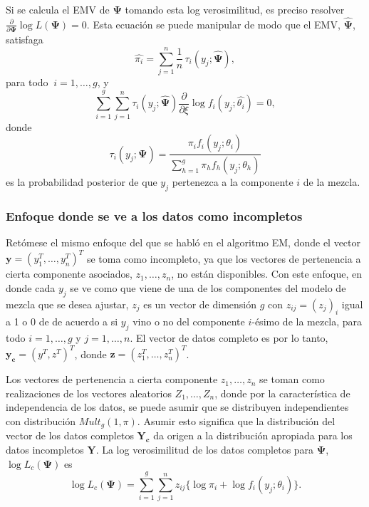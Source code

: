 \documentclass[
]{article}
\begin{document}
Si se calcula el EMV de \(\bm{\Psi}\) tomando esta log verosimilitud, es
preciso resolver
\(\frac{\partial}{\partial \bm{\Psi}} \log L(\bm{\Psi})=0\). Esta
ecuación se puede manipular de modo que el EMV, \(\bm{\hat{\Psi}}\),
satisfaga \begin{equation}
\hat{\pi_i}=\sum_{j=1}^n \frac{1}{n} \,\tau_i(y_j;\bm{\hat{\Psi}})\label{pis},
\end{equation} para todo \(\ i=1,\ldots,g\), y \begin{equation}
\sum_{i=1}^g \sum_{j=1}^n \tau_i(y_j;\bm{\hat{\Psi}}) \frac{\partial}{\partial \xi} \log f_i(y_j;\hat{\theta_i})=0,
\end{equation} donde \begin{equation}
\tau_i (y_j;\bm{\Psi})= \frac{ \pi_i f_i(y_j;\theta_i)}{\sum_{h=1}^{g} \pi_h f_h(y_j;\theta_h)}\label{tau}
\end{equation} es la probabilidad posterior de que \(y_j\) pertenezca a
la componente \(i\) de la mezcla.

\subsubsection{Enfoque donde se ve a los datos como incompletos}

Retómese el mismo enfoque del que se habló en el algoritmo EM, donde el
vector \(\bm{y}=(y_1^T,\ldots,y_n^T)^T\) se toma como incompleto, ya que
los vectores de pertenencia a cierta componente asociados,
\(z_1,\ldots,z_n\), no están disponibles. Con este enfoque, en donde
cada \(y_j\) se ve como que viene de una de los componentes del modelo
de mezcla que se desea ajustar, \(z_j\) es un vector de dimensión \(g\)
con \(z_{ij}=(z_j)_i\) igual a 1 o 0 de de acuerdo a si \(y_j\) vino o
no del componente \(i\)-ésimo de la mezcla, para todo \(i=1,\ldots,g\) y
\(j=1,\ldots,n\). El vector de datos completo es por lo tanto,
\(\bm{y_c}=(y^T,z^T)^T\), donde \(\bm{z}=(z_1^T,\ldots,z_n^T)^T\).

Los vectores de pertenencia a cierta componente \(z_1,\ldots,z_n\) se
toman como realizaciones de los vectores aleatorios \(Z_1,\ldots,Z_n\),
donde por la característica de independencia de los datos, se puede
asumir que se distribuyen independientes con distribución
\(Mult_g(1,\pi)\). Asumir esto significa que la distribución del vector
de los datos completos \(\bm{Y_c}\) da origen a la distribución
apropiada para los datos incompletos \(\bm{Y}\). La log verosimilitud de
los datos completos para \(\bm{\Psi}\), \(\log L_c(\bm{\Psi})\) es
\begin{equation}
\log L_c(\bm{\Psi})=\sum_{i=1}^g \sum_{j=1}^n z_{ij} \{ \log \pi_i+\log f_i(y_j;\theta_i) \} \label{logverosimilitud}.
\end{equation}
\end{document}
